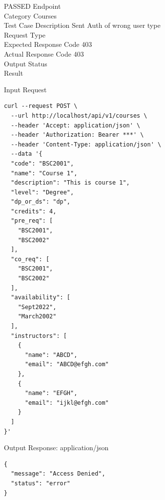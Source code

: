 \begin{testcase}{80}{PASSED}
Endpoint \hfill {}\\
Category \hfill Courses\\
Test Case Description \hfill Sent Auth of wrong user type\\

Request Type    \hfill {}\\
Expected Response Code    \hfill 403\\
Actual Response Code    \hfill 403\\

Output Status \hfill {}\\
Result \hfill {}

\begin{ipblock}{Input Request}
\begin{verbatim}
curl --request POST \
  --url http://localhost/api/v1/courses \
  --header 'Accept: application/json' \
  --header 'Authorization: Bearer ***' \
  --header 'Content-Type: application/json' \
  --data '{
  "code": "BSC2001",
  "name": "Course 1",
  "description": "This is course 1",
  "level": "Degree",
  "dp_or_ds": "dp",
  "credits": 4,
  "pre_req": [
    "BSC2001",
    "BSC2002"
  ],
  "co_req": [
    "BSC2001",
    "BSC2002"
  ],
  "availability": [
    "Sept2022",
    "March2002"
  ],
  "instructors": [
    {
      "name": "ABCD",
      "email": "ABCD@efgh.com"
    },
    {
      "name": "EFGH",
      "email": "ijkl@efgh.com"
    }
  ]
}'
\end{verbatim}
\end{ipblock}

\begin{opblock}{Output Response: application/json}
\begin{verbatim}
{
  "message": "Access Denied",
  "status": "error"
}
\end{verbatim}
\end{opblock}
\end{testcase}

